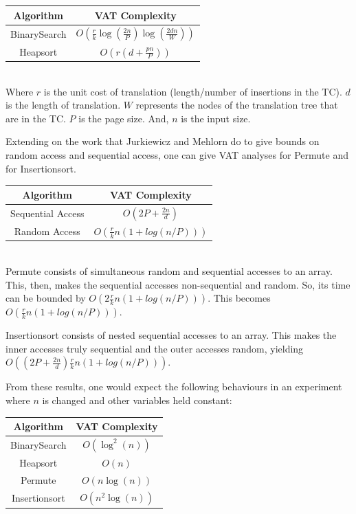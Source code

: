     \begin{tabular}{cc}
      Algorithm    & VAT Complexity\\\hline
      BinarySearch &
	$O\left(\frac{r}{k}\log(\frac{2n}{P})\log(\frac{2dn}{W})\right)$ \\
      Heapsort     & $O\left(r(d+\frac{pn}{P})\right)$ \\
    \end{tabular}\\
    
    Where $r$ is the unit cost of translation (length/number of insertions in
    the TC). $d$ is the length of translation. $W$ represents the nodes of the
    translation tree that are in the TC. $P$ is the page size. And, $n$ is the
    input size.
    
    Extending on the work that Jurkiewicz and Mehlorn do to give bounds on
    random access and sequential access, one can give VAT analyses for Permute
    and for Insertionsort.\\
    
    \begin{tabular}{cc}
      Algorithm & VAT Complexity\\\hline
      Sequential Access & $O\left(2P+\frac{2n}{d}\right)$\\
      Random Access & $O\left(\frac{r}{k}n(1+log(n/P))\right)$
    \end{tabular}\\
    
    Permute consists of simultaneous random and sequential accesses to an
    array. This, then, makes the sequential accesses non-sequential and random.
    So, its time can be bounded by 
    $O\left(2\frac{r}{k}n(1+log(n/P))\right)$.
    This becomes $O\left(\frac{r}{k}n(1+log(n/P))\right)$.
    
    Insertionsort consists of nested sequential accesses to an array. This
    makes the inner accesses truly sequential and the outer accesses random,
    yielding $O\left( (2P+\frac{2n}{d}) \frac{r}{k}n(1+log(n/P)) \right)$.
    
    From these results, one would expect the following behaviours in an
    experiment where $n$ is changed and other variables held constant:\\
    
    \begin{tabular}{cc}
      Algorithm & VAT Complexity\\\hline
      BinarySearch & $O\left(\log^2(n)\right)$\\
      Heapsort & $O\left( n \right)$\\
      Permute & $O\left( n\log(n) \right)$\\
      Insertionsort & $O\left( n^2 \log(n) \right)$\\
    \end{tabular}\\
    
